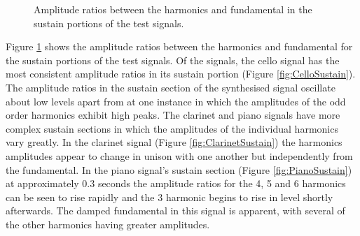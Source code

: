 \begin{figure}[h!]
			\quad
			\caption{Amplitude ratios between the harmonics and fundamental in the sustain
				 portions of the test signals.}
			\label{fig:SustainAmplitudes}
		\end{figure}

		Figure \ref{fig:SustainAmplitudes} shows the amplitude ratios between the harmonics and fundamental for the
		sustain portions of the test signals. Of the signals, the cello signal has the most consistent amplitude
		ratios in its sustain portion (Figure \ref{fig:CelloSustain}). The amplitude ratios in the sustain section
		of the synthesised signal oscillate about low levels apart from at one instance in which the amplitudes of
		the odd order harmonics exhibit high peaks. The clarinet and piano signals have more complex sustain
		sections in which the amplitudes of the individual harmonics vary greatly. In the clarinet signal (Figure
		\ref{fig:ClarinetSustain}) the harmonics amplitudes appear to change in unison with one another but
		independently from the fundamental. In the piano signal's sustain section (Figure \ref{fig:PianoSustain})
		at approximately 0.3 seconds the amplitude ratios for the 4, 5 and 6
		harmonics can be seen to rise rapidly and the 3 harmonic begins to rise in level shortly
		afterwards. The damped fundamental in this signal is apparent, with several of the other harmonics having
		greater amplitudes.

